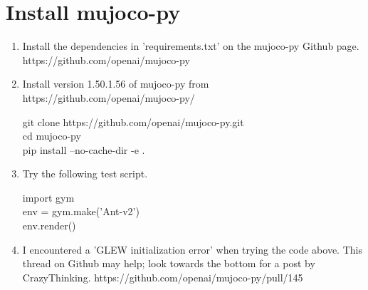 \documentclass{article}
\DeclareRobustCommand{\mybox}[2][gray!20]{%
\begin{tcolorbox}[   %
        breakable,
        left=0pt,
        right=0pt,
        top=0pt,
        bottom=0pt,
        colback=#1,
        colframe=#1,
        width=\dimexpr\textwidth\relax, 
        enlarge left by=0mm,
        boxsep=5pt,
        arc=0pt,outer arc=0pt,
        ]
        #2
\end{tcolorbox}
}
\begin{document}
\section{Install mujoco-py}
\begin{enumerate}
\item Install the dependencies in 'requirements.txt' on the mujoco-py Github page. https://github.com/openai/mujoco-py
\item Install version 1.50.1.56 of mujoco-py from https://github.com/openai/mujoco-py/
\mybox{git clone https://github.com/openai/mujoco-py.git
\\ cd mujoco-py
\\ pip install --no-cache-dir -e .}
\item Try the following test script.
\mybox{import gym
\\ env = gym.make('Ant-v2')
\\ env.render()}

\item I encountered a 'GLEW initialization error' when trying the code above. This thread on Github may help; look towards the bottom for a post by CrazyThinking. https://github.com/openai/mujoco-py/pull/145

\end{enumerate}


\small


\end{document}
